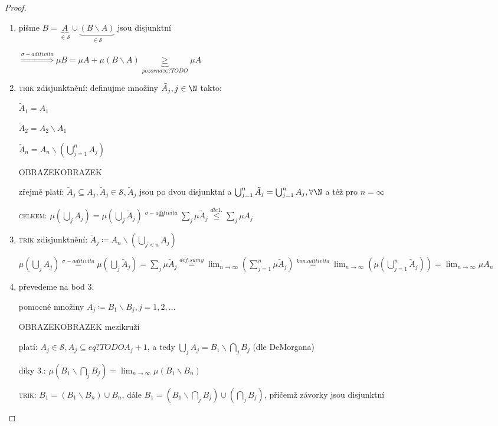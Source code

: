\begin{proof}
  \begin{enumerate}[{ad} 1.]
    \item pišme $B=\underbrace{A}_{\in \mathscr S}\cup\underbrace{(B\smallsetminus A)}_{\in \mathscr S}$ jsou disjunktní

    $\stackrel{\sigma-aditivita}{\Longrightarrow} \mu B = \mu A+ \mu (B \smallsetminus A)\underbrace{\geq}_{pozor na \infty? TODO} \mu A$
    \item \textsc{trik} zdisjunktnění: definujme množiny $\tilde{A}_j, j \in \N$ takto:

    $\tilde{A}_1 = A_1$

    $\tilde{A}_2 = A_2 \smallsetminus A_1$

    $\tilde{A}_n = A_n \smallsetminus \left(\bigcup_{j=1}^n A_j\right)$

    OBRAZEKOBRAZEK

    zřejmě platí: $\tilde{A}_j\subseteq A_j, \tilde{A}_j \in \mathscr S, \tilde{A}_j$ jsou po dvou disjunktní a $\bigcup_{j=1}^n \tilde{A}_j = \bigcup_{j=1}^n A_j, \forall \N$ a též pro $n=\infty$

    \textsc{celkem}: $\mu \left(\bigcup_j A_j\right) = \mu \left(\bigcup_j \tilde{A}_j \right) \stackrel{\sigma-aditivita}{=} \sum_j \mu \tilde{A}_j \stackrel{dle 1.}{\leq} \sum_j \mu A_j$
\item \textsc{trik} zdisjunktnění: $\tilde{A}_j \coloneq A_n \smallsetminus\left(\bigcup_{j<n}A_j\right)$

    $\mu \left(\bigcup_j A_j\right)\stackrel{\sigma-aditivita}{=} \mu \left(\bigcup_j \tilde{A}_j\right)=\sum_j \mu \tilde{A}_j \stackrel{def. sumy}{=} \lim_{n\to\infty}\left(\sum_{j=1}^{n}\mu \tilde A_j\right) \stackrel{kon. aditivita}{=} \lim_{n\to\infty}\left(\mu\left(\bigcup_{j=1}^n \tilde A_j\right)\right)= \lim_{n\to\infty} \mu A_n$
    \item převedeme na bod 3.

        pomocné množiny $A_j\coloneq B_1 \smallsetminus B_j, j = 1, 2, \dots$

        OBRAZEKOBRAZEK mezikruží

          platí: $A_j \in \mathscr S, A_j \subseteq eq? TODO A_j+1$, a tedy $\bigcup_j A_j = B_1 \smallsetminus \bigcap_j B_j$ (dle DeMorgana)

          díky 3.: $\mu \left(B_1 \smallsetminus \bigcap_j B_j\right) = \lim_{n\to \infty} \mu \left(B_1 \smallsetminus B_n\right)$

          \textsc{trik}: $B_1 = (B_1 \smallsetminus B_n)\cup B_n$, dále $B_1 = \left(B_1 \smallsetminus \bigcap_j B_j\right)\cup \left(\bigcap_j B_j\right)$, přičemž závorky jsou disjunktní


\end{enumerate}
\end{proof}
